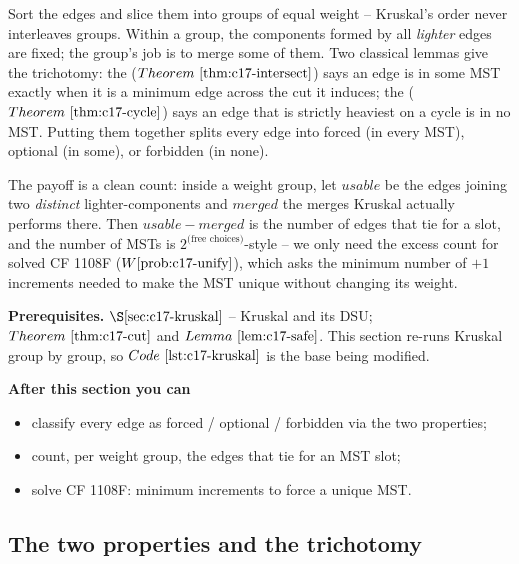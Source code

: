 \begin{topicintro}
Sort the edges and slice them into groups of equal weight -- Kruskal's order
never interleaves groups.  Within a group, the components formed by all
\emph{lighter} edges are fixed; the group's job is to merge some of them.  Two
classical lemmas give the trichotomy: the 
(\(\thmref{c17-intersect}\)) says an edge is in some MST exactly when it is a
minimum edge across the cut it induces; the 
(\(\thmref{c17-cycle}\)) says an edge that is strictly heaviest on a cycle is in
no MST.  Putting them together splits every edge into forced (in every MST),
optional (in some), or forbidden (in none).

The payoff is a clean count: inside a weight group, let \(\mathit{usable}\) be
the edges joining two \emph{distinct} lighter-components and \(\mathit{merged}\)
the merges Kruskal actually performs there.  Then \(\mathit{usable}-\mathit{merged}\)
is the number of edges that tie for a slot, and the number of MSTs is
\(2^{\text{(free choices)}}\)-style -- we only need the excess count for solved
CF 1108F (\(\probref{c17-unify}\)), which asks the minimum number of \(+1\)
increments needed to make the MST unique without changing its weight.

\textbf{Prerequisites.} \(\secref{c17-kruskal}\) -- Kruskal and its DSU;
\(\thmref{c17-cut}\) and \(\lemref{c17-safe}\).  This section re-runs Kruskal
group by group, so \(\coderef{c17-kruskal}\) is the base being modified.

\textbf{After this section you can}
\begin{itemize}[nosep]
  \item classify every edge as forced / optional / forbidden via the two properties; \hfill{}
  \item count, per weight group, the edges that tie for an MST slot; \hfill{}
  \item solve CF 1108F: minimum increments to force a unique MST. \hfill{}
\end{itemize}
\end{topicintro}

\subsection{The two properties and the trichotomy}

